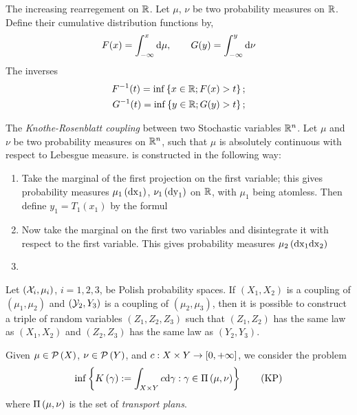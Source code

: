 The increasing rearregement on $\mathbb{R}$. Let $\mu$, $\nu$ be two probability measures on $\mathbb{R}$. Define their cumulative distribution functions by,
\begin{equation*}
	F(x)=\int_{-\infty}^{x}\mathrm{d}\mu, \qquad G(y)=\int_{-\infty}^{y}\mathrm{d}\nu	
\end{equation*}
The inverses
\begin{align*}
	F^{-1}(t)=\inf\left\lbrace x\in \mathbb{R}; F(x)>t \right\rbrace; \\
	G^{-1}(t)=\inf\left\lbrace y\in \mathbb{R}; G(y)>t \right\rbrace;
\end{align*}

The \textit{Knothe-Rosenblatt coupling} between two Stochastic variables $\mathbb{R}^n$. Let $\mu$ and $\nu$ be two probability measures on $\mathbb{R}^n$, such that $\mu$ is absolutely continuous with respect to Lebesgue measure.  is constructed in the following way:

\begin{enumerate}
	\item Take the marginal of the first projection on the first variable; this gives probability measures $\mu_1\left( \mathrm{dx}_1 \right)$, $\nu_1\left( \mathrm{dy}_1 \right)$ on $\mathbb{R}$, with $\mu_1$ being atomless. Then define $y_1=T_1(x_1)$ by the formul
	\item Now take the marginal on the first two variables and disintegrate it with respect to the first variable. This gives probability measures $\mu_2\left( \mathrm{dx}_1\mathrm{dx}_2 \right)$
	\item 
\end{enumerate} 


\begin{lemma} Let $(\mathcal{X}_i , \mu_i)$, $i = 1, 2, 3$,  be Polish probability spaces. If $(X_1 , X_2)$ is a coupling of $(\mu_1, \mu_2 )$ and $(\mathcal{Y}_2 , Y_3)$ is a coupling of $(\mu_2, \mu_3)$, then it is possible to construct a triple of random variables $(Z_1 , Z_2, Z_3)$ such that $(Z_1, Z_2)$ has the same law as $(X_1 , X_2)$ and $(Z_2, Z_3)$ has the same law as $(Y_2 , Y_3)$.
\end{lemma}


\begin{problem}Given $\mu \in \mathcal{P}\left( X \right)$, $\nu \in \mathcal{P}\left( Y \right)$, and $c: X\times Y \rightarrow \left[ 0, +\infty \right]$, we consider the problem
	\begin{equation}
		\inf\left\lbrace K\left(\gamma\right) := \int_{X\times Y} c \mathrm{d}\gamma : \gamma \in \Pi\left(\mu, \nu\right) \right\rbrace\label{eq: Kantorovich's Problem.}\tag{KP}
	\end{equation}
where $\Pi\left(\mu, \nu\right)$ is the set of \textit{transport plans}.
\end{problem}




